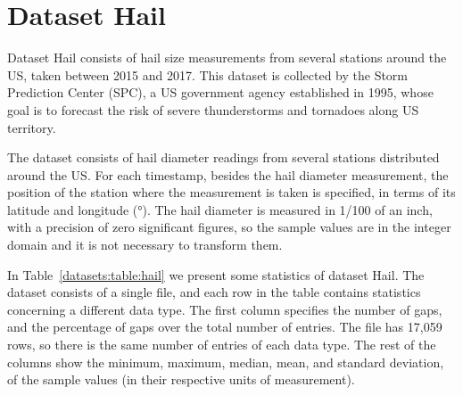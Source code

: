 
\vspace{-10pt}
\section{Dataset Hail}
\label{datasets:hail}
\newcommand{\SPCDef}{This dataset is collected by the Storm Prediction Center (SPC), a US government agency established in 1995, whose goal is to forecast the risk of severe thunderstorms and tornadoes along US territory.}

Dataset Hail \cite{dataset:spc} consists of hail size measurements from several stations around the US, taken between 2015 and 2017. \SPCDef


The dataset consists of hail diameter readings from several stations distributed around the US. For each timestamp, besides the hail diameter measurement, the position of the station where the measurement is taken is specified, in terms of its latitude and longitude (°). The hail diameter is measured in 1/100 of an inch, with a precision of zero significant figures, so the sample values are in the integer domain and it is not necessary to transform them.


\newcommand{\SPCTable}{The dataset consists of a single file, and each row in the table contains statistics concerning a different data type. The first column specifies the number of gaps, and the percentage of gaps over the total number of entries. }

In Table~\ref{datasets:table:hail} we present some statistics of dataset Hail. \SPCTable The file has 17,059 rows, so there is the same number of entries of each data type. The rest of the columns show the minimum, maximum, median, mean, and standard deviation, of the sample values (in their respective units of measurement).




